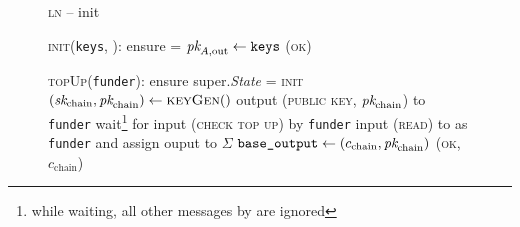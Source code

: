 \begin{figure}[H]
  \begin{processbox}{\textsc{ln} -- init}
    \begin{algorithmic}[1]
      \State \textsc{init}(\texttt{keys}, \dave):
      \Indent
        \State ensure \dave = \alice
        \State $\textit{pk}_{A, \mathrm{out}} \gets \texttt{keys}$
        \State \Return (\textsc{ok})
      \EndIndent
      \Statex

      \State \textsc{topUp}(\texttt{funder}): 
      \Indent
        \State ensure super.\textit{State} = \textsc{init}
        \State $(\textit{sk}_{\mathrm{chain}}, \textit{pk}_{\mathrm{chain}}) \gets
        \textsc{keyGen}()$
        \State output (\textsc{public key}, $\textit{pk}_{\mathrm{chain}}$) to
        \texttt{funder}
          \State wait\footnote{while waiting, all other messages by \dave are
          ignored} for input (\textsc{check top up}) by \texttt{funder}
          \State input (\textsc{read}) to \ledger as \texttt{funder} and assign
          ouput to $\Sigma$
        \EndWhile
        \State $\texttt{base\_output} \gets (c_{\mathrm{chain}},
        \textit{pk}_{\mathrm{chain}})$
        \State \Return (\textsc{ok}, $c_{\mathrm{chain}}$)
      \EndIndent
    \end{algorithmic}
  \end{processbox}
  \caption{}
  \label{code:ln:init}
\end{figure}


